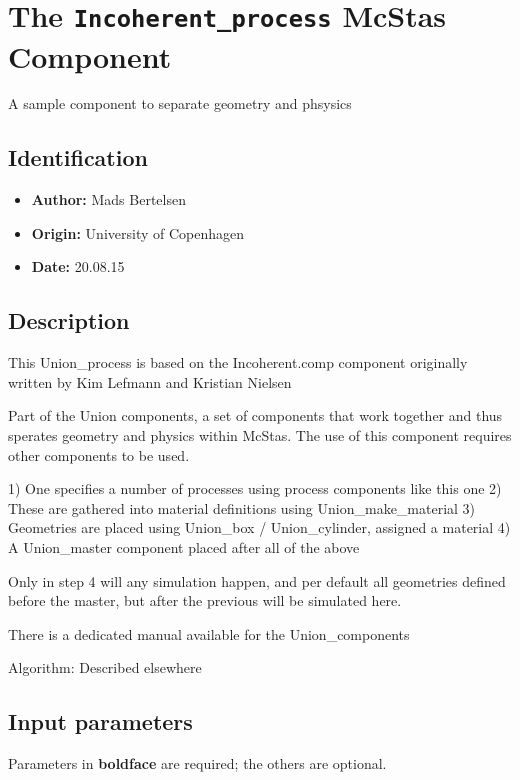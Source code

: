 \section{The \texttt{Incoherent\_process} McStas Component}
A sample component to separate geometry and phsysics

\subsection*{Identification}
\begin{itemize}
  \item \textbf{Author:} Mads Bertelsen
  \item \textbf{Origin:} University of Copenhagen
  \item \textbf{Date:} 20.08.15
\end{itemize}

\subsection*{Description}
This Union\_process is based on the Incoherent.comp component originally written by Kim Lefmann and Kristian Nielsen

Part of the Union components, a set of components that work together and thus sperates geometry and physics within McStas. The use of this component requires other components to be used.

1) One specifies a number of processes using process components like this one 2) These are gathered into material definitions using Union\_make\_material 3) Geometries are placed using Union\_box / Union\_cylinder, assigned a material 4) A Union\_master component placed after all of the above

Only in step 4 will any simulation happen, and per default all geometries defined before the master, but after the previous will be simulated here.

There is a dedicated manual available for the Union\_components

Algorithm: Described elsewhere

\subsection*{Input parameters}
Parameters in \textbf{boldface} are required; the others are optional.

